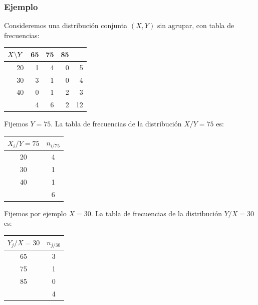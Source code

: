 \begin{frame}
\frametitle{Ejemplo}
Consideremos una distribución conjunta $(X,Y)$ sin agrupar, con tabla de frecuencias:

\begin{center}
\begin{tabular}{r|rrr|r}
$X \mbox{\mbox{\textbackslash}} Y$ & 65 & 75 & 85 & \\ \hline 20 & 1 & 4 & 0 & 5 \\ 30 & 3 & 1 & 0 & 4 \\ 40 & 0 & 1 &
2 & 3 \\ \hline & 4 & 6 & 2 & 12
\end{tabular}
\end{center}
\end{frame}


\begin{frame}
Fijemos  $Y=75$. La tabla de frecuencias de la distribución $X/Y=75$ es:

\begin{center}
\begin{tabular}{c|c}
$X_i/Y=75$ &        $n_{i/75}$ \\ \hline 20     &     4 \\
 30      &    1 \\
40      &    1   \\ \hline
    &        6
\end{tabular}
\end{center}
\end{frame}


\begin{frame}
Fijemos por 
ejemplo $X=30$. La tabla de frecuencias de la distribución $Y/X=30$ es:

\begin{center}
\begin{tabular}{c|c}
 $Y_j/X=30$ &         $n_{j/30}$ \\
\hline 65     &    3 \\ 75     &    1 \\ 85     &    0 \\ \hline
       &      4
\end{tabular}
\end{center}
\end{frame}

